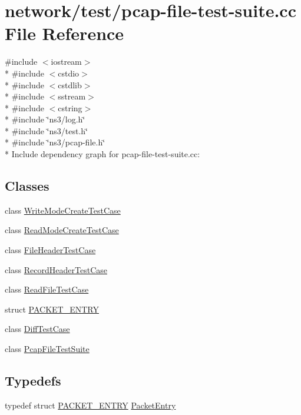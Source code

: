 \hypertarget{pcap-file-test-suite_8cc}{}\section{network/test/pcap-\/file-\/test-\/suite.cc File Reference}
\label{pcap-file-test-suite_8cc}
{\ttfamily \#include $<$iostream$>$}\\*
{\ttfamily \#include $<$cstdio$>$}\\*
{\ttfamily \#include $<$cstdlib$>$}\\*
{\ttfamily \#include $<$sstream$>$}\\*
{\ttfamily \#include $<$cstring$>$}\\*
{\ttfamily \#include \char`\"{}ns3/log.\+h\char`\"{}}\\*
{\ttfamily \#include \char`\"{}ns3/test.\+h\char`\"{}}\\*
{\ttfamily \#include \char`\"{}ns3/pcap-\/file.\+h\char`\"{}}\\*
Include dependency graph for pcap-\/file-\/test-\/suite.cc\+:
\subsection*{Classes}
\begin{DoxyCompactItemize}
\item 
class \hyperlink{classWriteModeCreateTestCase}{Write\+Mode\+Create\+Test\+Case}
\item 
class \hyperlink{classReadModeCreateTestCase}{Read\+Mode\+Create\+Test\+Case}
\item 
class \hyperlink{classFileHeaderTestCase}{File\+Header\+Test\+Case}
\item 
class \hyperlink{classRecordHeaderTestCase}{Record\+Header\+Test\+Case}
\item 
class \hyperlink{classReadFileTestCase}{Read\+File\+Test\+Case}
\item 
struct \hyperlink{structPACKET__ENTRY}{P\+A\+C\+K\+E\+T\+\_\+\+E\+N\+T\+RY}
\item 
class \hyperlink{classDiffTestCase}{Diff\+Test\+Case}
\item 
class \hyperlink{classPcapFileTestSuite}{Pcap\+File\+Test\+Suite}
\end{DoxyCompactItemize}
\subsection*{Typedefs}
\begin{DoxyCompactItemize}
\item 
typedef struct \hyperlink{structPACKET__ENTRY}{P\+A\+C\+K\+E\+T\+\_\+\+E\+N\+T\+RY} \hyperlink{pcap-file-test-suite_8cc_a07a6d9abbb9c6f00cecc5347d1a5ae9e}{Packet\+Entry}
\end{DoxyCompactItemize}
